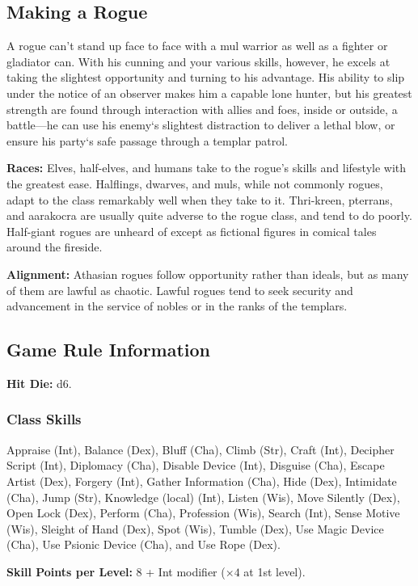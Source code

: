 \subsection{Making a Rogue}

A rogue can't stand up face to face with a mul warrior as well as a fighter or gladiator can. With his cunning and your various skills, however, he excels at taking the slightest opportunity and turning to his advantage. His ability to slip under the notice of an observer makes him a capable lone hunter, but his greatest strength are found through interaction with allies and foes, inside or outside, a battle---he can use his enemy`s slightest distraction to deliver a lethal blow, or ensure his party`s safe passage through a templar patrol.

\textbf{Races:} Elves, half-elves, and humans take to the rogue's skills and lifestyle with the greatest ease. Halflings, dwarves, and muls, while not commonly rogues, adapt to the class remarkably well when they take to it. Thri-kreen, pterrans, and aarakocra are usually quite adverse to the rogue class, and tend to do poorly. Half-giant rogues are unheard of except as fictional figures in comical tales around the fireside.

\textbf{Alignment:} Athasian rogues follow opportunity rather than ideals, but as many of them are lawful as chaotic. Lawful rogues tend to seek security and advancement in the service of nobles or in the ranks of the templars.

\subsection{Game Rule Information}
\textbf{Hit Die:} d6.

\subsubsection{Class Skills}
Appraise (Int), Balance (Dex), Bluff (Cha), Climb (Str), Craft (Int), Decipher Script (Int), Diplomacy (Cha), Disable Device (Int), Disguise (Cha), Escape Artist (Dex), Forgery (Int), Gather Information (Cha), Hide (Dex), Intimidate (Cha), Jump (Str), Knowledge (local) (Int), Listen (Wis), Move Silently (Dex), Open Lock (Dex), Perform (Cha), Profession (Wis), Search (Int), Sense Motive (Wis), Sleight of Hand (Dex), Spot (Wis), Tumble (Dex), Use Magic Device (Cha), Use Psionic Device (Cha), and Use Rope (Dex).

\textbf{Skill Points per Level:} 8 + Int modifier ($\times4$ at 1st level).

